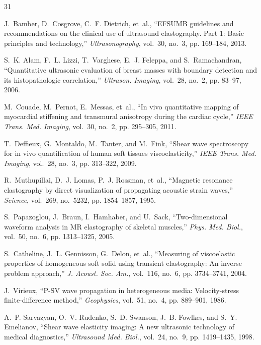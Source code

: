 \documentclass[journal]{IEEEtran}
\begin{document}


\begin{thebibliography}{31}

J.~Bamber, D.~Cosgrove, C.~F. Dietrich, et~al., ``EFSUMB guidelines and recommendations on the clinical use of ultrasound elastography. Part 1: Basic principles and technology,'' \emph{Ultrasonography}, vol.~30, no.~3, pp. 169--184, 2013.

S.~K. Alam, F.~L. Lizzi, T.~Varghese, E.~J. Feleppa, and S.~Ramachandran, ``Quantitative ultrasonic evaluation of breast masses with boundary detection and its histopathologic correlation,'' \emph{Ultrason. Imaging}, vol.~28, no.~2, pp. 83--97, 2006.

M.~Couade, M.~Pernot, E.~Messas, et~al., ``In vivo quantitative mapping of myocardial stiffening and transmural anisotropy during the cardiac cycle,'' \emph{IEEE Trans. Med. Imaging}, vol.~30, no.~2, pp. 295--305, 2011.

T.~Deffieux, G.~Montaldo, M.~Tanter, and M.~Fink, ``Shear wave spectroscopy for in vivo quantification of human soft tissues viscoelasticity,'' \emph{IEEE Trans. Med. Imaging}, vol.~28, no.~3, pp. 313--322, 2009.

R.~Muthupillai, D.~J. Lomas, P.~J. Rossman, et~al., ``Magnetic resonance elastography by direct visualization of propagating acoustic strain waves,'' \emph{Science}, vol.~269, no.~5232, pp. 1854--1857, 1995.

S.~Papazoglou, J.~Braun, I.~Hamhaber, and U.~Sack, ``Two-dimensional waveform analysis in MR elastography of skeletal muscles,'' \emph{Phys. Med. Biol.}, vol.~50, no.~6, pp. 1313--1325, 2005.

S.~Catheline, J.~L. Gennisson, G.~Delon, et~al., ``Measuring of viscoelastic properties of homogeneous soft solid using transient elastography: An inverse problem approach,'' \emph{J. Acoust. Soc. Am.}, vol.~116, no.~6, pp. 3734--3741, 2004.

J.~Virieux, ``P-SV wave propagation in heterogeneous media: Velocity-stress finite-difference method,'' \emph{Geophysics}, vol.~51, no.~4, pp. 889--901, 1986.

A.~P. Sarvazyan, O.~V. Rudenko, S.~D. Swanson, J.~B. Fowlkes, and S.~Y. Emelianov, ``Shear wave elasticity imaging: A new ultrasonic technology of medical diagnostics,'' \emph{Ultrasound Med. Biol.}, vol.~24, no.~9, pp. 1419--1435, 1998.


\end{thebibliography}
\end{document}
